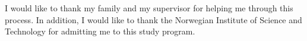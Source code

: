 
\noindent I would like to thank my family and my supervisor for helping me through this process. In addition, I would like to thank the Norwegian Institute of Science and Technology for admitting me to this study program.
